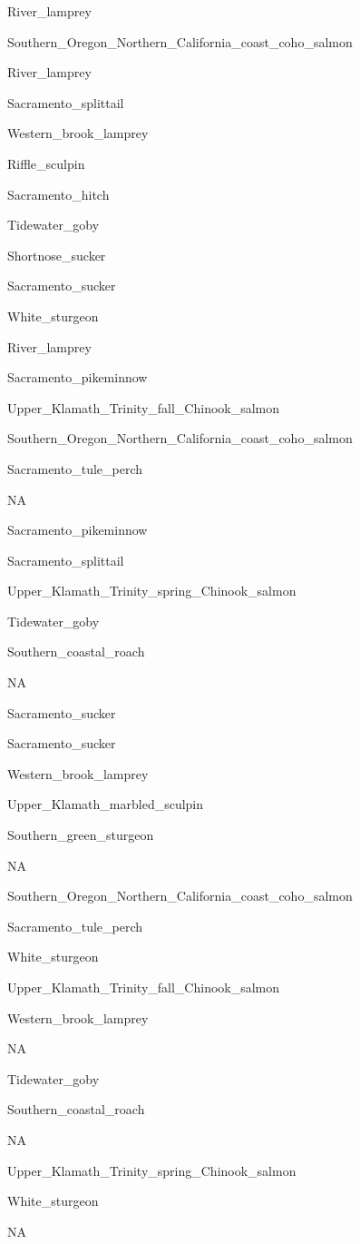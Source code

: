\documentclass[]{article}
\begin{document}
River\_lamprey

Southern\_Oregon\_Northern\_California\_coast\_coho\_salmon

River\_lamprey

Sacramento\_splittail

Western\_brook\_lamprey

Riffle\_sculpin

Sacramento\_hitch

Tidewater\_goby

Shortnose\_sucker

Sacramento\_sucker

White\_sturgeon

River\_lamprey

Sacramento\_pikeminnow

Upper\_Klamath\_Trinity\_fall\_Chinook\_salmon

Southern\_Oregon\_Northern\_California\_coast\_coho\_salmon

Sacramento\_tule\_perch

NA

Sacramento\_pikeminnow

Sacramento\_splittail

Upper\_Klamath\_Trinity\_spring\_Chinook\_salmon

Tidewater\_goby

Southern\_coastal\_roach

NA

Sacramento\_sucker

Sacramento\_sucker

Western\_brook\_lamprey

Upper\_Klamath\_marbled\_sculpin

Southern\_green\_sturgeon

NA

Southern\_Oregon\_Northern\_California\_coast\_coho\_salmon

Sacramento\_tule\_perch

White\_sturgeon

Upper\_Klamath\_Trinity\_fall\_Chinook\_salmon

Western\_brook\_lamprey

NA

Tidewater\_goby

Southern\_coastal\_roach

NA

Upper\_Klamath\_Trinity\_spring\_Chinook\_salmon

White\_sturgeon

NA
\end{document}

